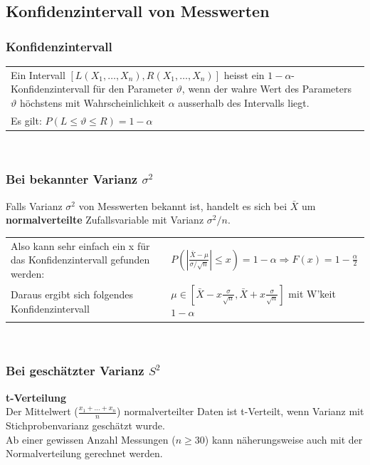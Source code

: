 	\subsection{Konfidenzintervall von Messwerten}
		\subsubsection{Konfidenzintervall \skript{\pageref{sk-section-konfidenzintervalle}}}
			\begin{tabular}{p{18cm}}
		     Ein Intervall $[L(X_1,\ldots,X_n),R(X_1,\ldots,X_n)]$ heisst ein
		     $1-\alpha$- Konfidenzintervall für den Parameter $\vartheta$, wenn der wahre
		     Wert des Parameters $\vartheta$ höchstens mit Wahrscheinlichkeit $\alpha$
		     ausserhalb des Intervalls liegt.\\
		     Es gilt: $P(L \leq \vartheta \leq R) = 1-\alpha$
		    \end{tabular}\\
		    
	   
    \subsubsection{Bei bekannter Varianz $\sigma^2$}
     Falls Varianz $\sigma^2$ von Messwerten bekannt ist, handelt es sich bei $\bar{X}$ um \textbf{normalverteilte} Zufallsvariable mit Varianz $\sigma^2/n$. \\
    \begin{tabular}{p{8cm}p{8cm}}
    Also kann sehr einfach ein x für das Konfidenzintervall gefunden werden:
    &$P\left(\left|\frac{\bar{X}-\mu}{\sigma / \sqrt{n}}\right|\leq x\right) = 1 - \alpha \Rightarrow F(x) = 1- \frac{\alpha}{2}$\\
    Daraus ergibt sich folgendes Konfidenzintervall
    &$\mu\in\left[\bar{X}-x\frac{\sigma}{\sqrt{n}},\bar{X}+x\frac{\sigma}{\sqrt{n}}\right]$ mit W'keit $1-\alpha$\\
    \end{tabular}\\
    
    \subsubsection{Bei geschätzter Varianz $S^2$}
    \textbf{t-Verteilung}\\
    	Der Mittelwert ($\frac{x_1+\ldots+x_n}{n}$) normalverteilter Daten ist
        t-Verteilt, wenn Varianz mit Stichprobenvarianz geschätzt wurde.\\
        Ab einer gewissen Anzahl Messungen ($n \geq 30$) kann näherungsweise auch mit
        der Normalverteilung gerechnet werden.  \\
    
